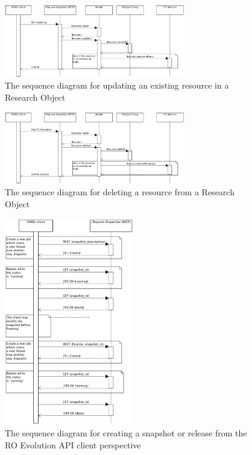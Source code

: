 \begin{figure}[!hb]
\centering
\includegraphics[width=0.7\textwidth]{Figures/RODL/ResourceUpdate.png}
\caption{The sequence diagram for updating an existing resource in a Research Object}
\label{ResourceUpdate}
\end{figure}

\begin{figure}[!hb]
\centering
\includegraphics[width=0.7\textwidth]{Figures/RODL/ResourceDelete.png}
\caption{The sequence diagram for deleting a resource from a Research Object}
\label{ResourceDelete}
\end{figure}

\begin{figure}[!hb]
\centering
\includegraphics[width=0.5\textwidth]{Figures/RODL/SnapshotClient.png}
\caption{The sequence diagram for creating a snapshot or release from the RO Evolution API client perspective}
\label{SnapshotClient}
\end{figure}

